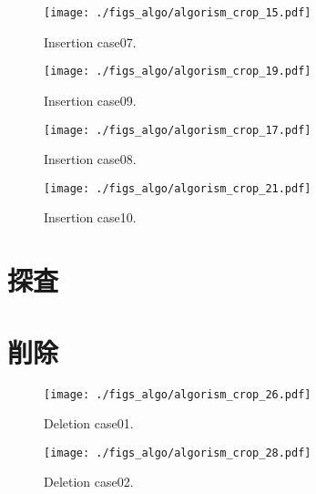 \begin{figure}[h]
  \vspace{-0.5cm}
  \texttt{[image: ./figs\_algo/algorism\_crop\_15.pdf]}
  \caption{
    Insertion case07.%
  }
  \label{fig_IpCHashT_insert_hard_case07}
  \vspace{-0.5cm}
\end{figure}

\begin{figure}[h]
  \vspace{-0.5cm}
  \texttt{[image: ./figs\_algo/algorism\_crop\_19.pdf]}
  \caption{
    Insertion case09.
  }
  \label{fig_IpCHashT_insert_hard_case09}
  \vspace{-0.5cm}
\end{figure}

\begin{figure}[h]
  \vspace{-0.5cm}
  \texttt{[image: ./figs\_algo/algorism\_crop\_17.pdf]}
  \caption{
    Insertion case08.%
  }
  \label{fig_IpCHashT_insert_hard_case08}
  \vspace{-0.5cm}
\end{figure}

\begin{figure}[h]
  \vspace{-0.5cm}
  \texttt{[image: ./figs\_algo/algorism\_crop\_21.pdf]}
  \caption{
    Insertion case10.
  }
  \label{fig_IpCHashT_insert_hard_case10}
  \vspace{-0.5cm}
\end{figure}





\section{探査}


\section{削除}
\begin{figure}[h]
  \vspace{-0.5cm}
  \texttt{[image: ./figs\_algo/algorism\_crop\_26.pdf]}
  \caption{
    Deletion case01.
  }
  \label{fig_IpCHashT_deletion_case01}
  \vspace{-0.5cm}
\end{figure}

\begin{figure}[h]
  \vspace{-0.5cm}
  \texttt{[image: ./figs\_algo/algorism\_crop\_28.pdf]}
  \caption{
    Deletion case02.
  }
  \label{fig_IpCHashT_deletion_case02}
  \vspace{-0.5cm}
\end{figure}

